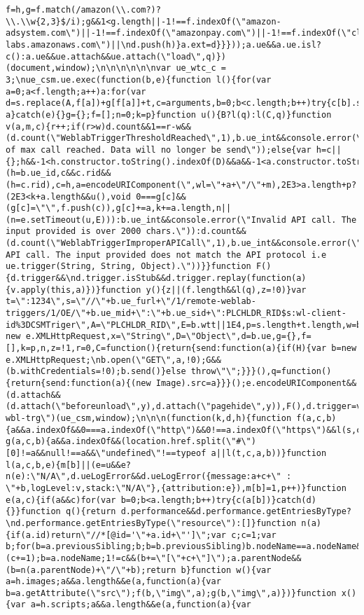 \documentclass[
]{article}
\begin{document}
\begin{verbatim}
f=h,g=f.match(/amazon(\\.com?)?\\.\\w{2,3}$/i);g&&1<g.length||-1!==f.indexOf(\"amazon-adsystem.com\")||-1!==f.indexOf(\"amazonpay.com\")||-1!==f.indexOf(\"cloudfront-labs.amazonaws.com\")||\nd.push(h)}a.ext=d}}}));a.ue&&a.ue.isl?c():a.ue&&ue.attach&&ue.attach(\"load\",q)})(document,window);\n\n\n\n\n\nvar ue_wtc_c = 3;\nue_csm.ue.exec(function(b,e){function l(){for(var a=0;a<f.length;a++)a:for(var d=s.replace(A,f[a])+g[f[a]]+t,c=arguments,b=0;b<c.length;b++)try{c[b].send(d);break a}catch(e){}g={};f=[];n=0;k=p}function u(){B?l(q):l(C,q)}function v(a,m,c){r++;if(r>w)d.count&&1==r-w&&(d.count(\"WeblabTriggerThresholdReached\",1),b.ue_int&&console.error(\"Number of max call reached. Data will no longer be send\"));else{var h=c||{};h&&-1<h.constructor.toString().indexOf(D)&&a&&-1<a.constructor.toString().indexOf(x)&&m&&-1<\nm.constructor.toString().indexOf(x)?(h=b.ue_id,c&&c.rid&&(h=c.rid),c=h,a=encodeURIComponent(\",wl=\"+a+\"/\"+m),2E3>a.length+p?(2E3<k+a.length&&u(),void 0===g[c]&&(g[c]=\"\",f.push(c)),g[c]+=a,k+=a.length,n||(n=e.setTimeout(u,E))):b.ue_int&&console.error(\"Invalid API call. The input provided is over 2000 chars.\")):d.count&&(d.count(\"WeblabTriggerImproperAPICall\",1),b.ue_int&&console.error(\"Invalid API call. The input provided does not match the API protocol i.e ue.trigger(String, String, Object).\"))}}function F(){d.trigger&&\nd.trigger.isStub&&d.trigger.replay(function(a){v.apply(this,a)})}function y(){z||(f.length&&l(q),z=!0)}var t=\":1234\",s=\"//\"+b.ue_furl+\"/1/remote-weblab-triggers/1/OE/\"+b.ue_mid+\":\"+b.ue_sid+\":PLCHLDR_RID$s:wl-client-id%3DCSMTriger\",A=\"PLCHLDR_RID\",E=b.wtt||1E4,p=s.length+t.length,w=b.mwtc||2E3,G=1===e.ue_wtc_c,B=3===e.ue_wtc_c,H=e.XMLHttpRequest&&\"withCredentials\"in new e.XMLHttpRequest,x=\"String\",D=\"Object\",d=b.ue,g={},f=[],k=p,n,z=!1,r=0,C=function(){return{send:function(a){if(H){var b=new e.XMLHttpRequest;\nb.open(\"GET\",a,!0);G&&(b.withCredentials=!0);b.send()}else throw\"\";}}}(),q=function(){return{send:function(a){(new Image).src=a}}}();e.encodeURIComponent&&(d.attach&&(d.attach(\"beforeunload\",y),d.attach(\"pagehide\",y)),F(),d.trigger=v)},\"client-wbl-trg\")(ue_csm,window);\n\n\n(function(k,d,h){function f(a,c,b){a&&a.indexOf&&0===a.indexOf(\"http\")&&0!==a.indexOf(\"https\")&&l(s,c,a,b)}function g(a,c,b){a&&a.indexOf&&(location.href.split(\"#\")[0]!=a&&null!==a&&\"undefined\"!==typeof a||l(t,c,a,b))}function l(a,c,b,e){m[b]||(e=u&&e?n(e):\"N/A\",d.ueLogError&&d.ueLogError({message:a+c+\" : \"+b,logLevel:v,stack:\"N/A\"},{attribution:e}),m[b]=1,p++)}function e(a,c){if(a&&c)for(var b=0;b<a.length;b++)try{c(a[b])}catch(d){}}function q(){return d.performance&&d.performance.getEntriesByType?\nd.performance.getEntriesByType(\"resource\"):[]}function n(a){if(a.id)return\"//*[@id='\"+a.id+\"']\";var c;c=1;var b;for(b=a.previousSibling;b;b=b.previousSibling)b.nodeName==a.nodeName&&(c+=1);b=a.nodeName;1!=c&&(b+=\"[\"+c+\"]\");a.parentNode&&(b=n(a.parentNode)+\"/\"+b);return b}function w(){var a=h.images;a&&a.length&&e(a,function(a){var b=a.getAttribute(\"src\");f(b,\"img\",a);g(b,\"img\",a)})}function x(){var a=h.scripts;a&&a.length&&e(a,function(a){var 
\end{verbatim}
\end{document}
